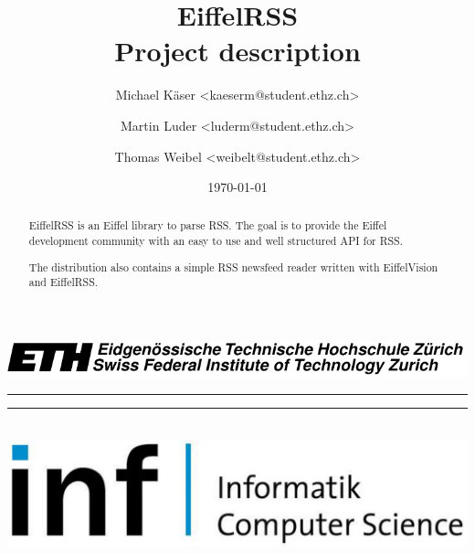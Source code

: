 \documentclass[a4paper,fleqn,titlepage]{article}
\title{EiffelRSS \\ Project description}
\author{
  Michael K\"aser <kaeserm@student.ethz.ch>
  \and 
  Martin Luder <luderm@student.ethz.ch>
  \and 
  Thomas Weibel <weibelt@student.ethz.ch>
}
\date{\today}
\newcommand{\hr}{\rule{\textwidth}{1pt}}
\begin{document}
\begin{titlepage}
  \newlength{\centeroffset}
  \setlength{\centeroffset}{-0.5\oddsidemargin}
  \addtolength{\centeroffset}{0.5\evensidemargin}

  \thispagestyle{empty}

  \noindent\includegraphics[width=\textwidth]{../eth-logo/big_ETH}\\[-3mm]
  \hr






  \noindent\hr\\[1mm]
  \includegraphics[width=\textwidth]{../eth-logo/big_inf}
\end{titlepage}

\begin{abstract}
  EiffelRSS is an Eiffel library to parse RSS. The goal is to provide
  the Eiffel development community with an easy to use and well
  structured API for RSS.
  
  The distribution also contains a simple RSS newsfeed reader written
  with EiffelVision and EiffelRSS.
\end{abstract}
\end{document}

